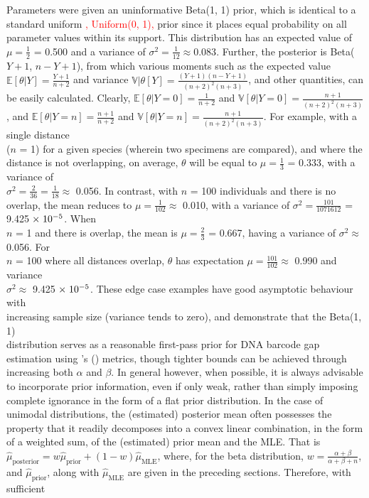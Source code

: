 \documentclass[12pt]{article}
\begin{document}
Parameters were given an uninformative Beta(1, 1) prior, which is identical to a standard uniform \textcolor{red}{, Uniform(0, 1),} prior since it places equal probability on all parameter values within its support. This distribution has an expected value of $\mu = \frac{1}{2}$ = 0.500 and a variance of $\sigma^2 = \frac{1}{12} \approx 0.083$. Further, the posterior is Beta($Y + 1$, $n - Y + 1$), from which various moments such as the expected value $\mathbb{E}[\theta|Y] = \frac{Y + 1}{n + 2}$ and variance $\mathbb{V|\theta}[Y] = \frac{(Y + 1)(n - Y + 1)}{(n + 2)^2(n + 3)}$, and other quantities, can be easily calculated. Clearly, $\mathbb{E}[\theta|Y = 0] = \frac{1}{n + 2}$ and $\mathbb{V}[\theta|Y = 0] = \frac{n + 1}{(n + 2)^2(n + 3)}$, and $\mathbb{E}[\theta|Y = n] = \frac{n + 1}{n + 2}$ and $\mathbb{V}[\theta|Y = n] = \frac{n + 1}{(n + 2)^2(n + 3)}$. For example, with a single distance \\ ($n$ = 1) for a given species (wherein two specimens are compared), and where the distance is not overlapping, on average, $\theta$ will be equal to $\mu = \frac{1}{3}$ = 0.333, with a variance of \\ $\sigma^2 = \frac{2}{36} = \frac{1}{18} \approx$ 0.056. In contrast, with $n$ = 100 individuals and there is no overlap, the mean reduces to $\mu = \frac{1}{102} \approx$ 0.010, with a variance of $\sigma^2 = \frac{101}{1071612}$ = 9.425$\hspace{1mm} \times \hspace{1mm} 10^{-5}$. When \\ $n$ = 1 and there is overlap, the mean is $\mu = \frac{2}{3}$ = 0.667, having a variance of $\sigma^2 \approx$ 0.056. For \\ $n$ = 100 where all distances overlap, $\theta$ has expectation $\mu = \frac{101}{102} \approx$ 0.990 and variance \\ $\sigma^2 \approx$ 9.425$\hspace{1mm} \times \hspace{1mm} 10^{-5}$. These edge case examples have good asymptotic behaviour with \\ increasing sample size (variance tends to zero), and demonstrate that the Beta(1, 1) \\ distribution serves as a reasonable first-pass prior for DNA barcode gap estimation using \citeauthor{phillips2024measure}'s (\citeyear{phillips2024measure}) metrics, though tighter bounds can be achieved through increasing both $\alpha$ and $\beta$. In general however, when possible, it is always advisable to incorporate prior information, even if only weak, rather than simply imposing complete ignorance in the form of a flat prior distribution. In the case of unimodal distributions, the (estimated) posterior mean often possesses the property that it readily decomposes into a convex linear combination, in the form of a weighted sum, of the (estimated) prior mean and the MLE. That is $\hat{\mu}_\mathrm{posterior} = w\hat{\mu}_\mathrm{prior} + (1-w)\hat{\mu}_\mathrm{MLE}$, where, for the beta distribution, $w = \frac{\alpha + \beta}{\alpha + \beta + n}$, and $\hat{\mu}_\mathrm{prior}$, along with $\hat{\mu}_\mathrm{MLE}$ are given in the preceding sections. Therefore, with sufficient 
\end{document}
